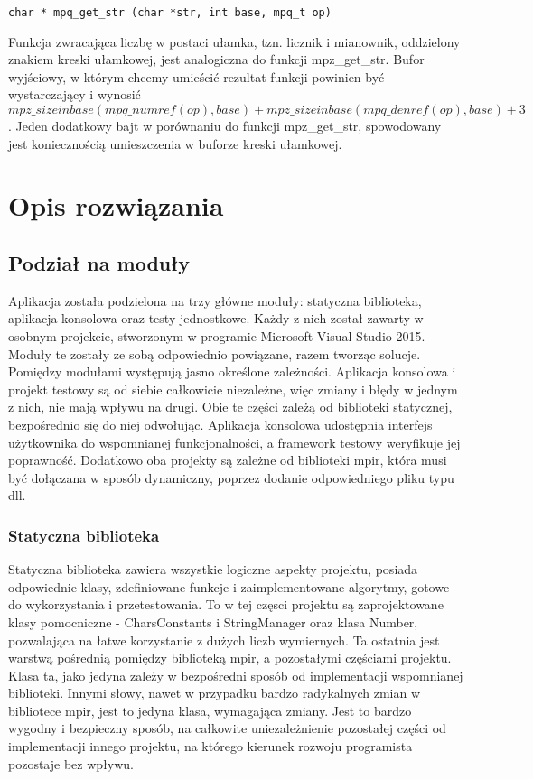 \documentclass[twoside,a4paper]{book}
\begin{document}
\begin{lstlisting}
char * mpq_get_str (char *str, int base, mpq_t op)
\end{lstlisting}

Funkcja zwracająca liczbę w postaci ułamka, tzn. licznik i mianownik, oddzielony znakiem kreski ułamkowej, jest analogiczna do funkcji mpz\_get\_str. Bufor wyjściowy, w którym chcemy umieścić rezultat funkcji powinien być wystarczający i wynosić $mpz\_sizeinbase(mpq\_numref(op), base) + mpz\_sizeinbase (mpq\_denref(op), base) + 3$. Jeden dodatkowy bajt w porównaniu do funkcji mpz\_get\_str, spowodowany jest koniecznością umieszczenia w buforze kreski ułamkowej.


\chapter{Opis rozwiązania}
\section{Podział na moduły}

Aplikacja została podzielona na trzy główne moduły: statyczna biblioteka, aplikacja konsolowa oraz testy jednostkowe. Każdy z nich został zawarty w osobnym projekcie, stworzonym w programie Microsoft Visual Studio 2015. Moduły te zostały ze sobą odpowiednio powiązane, razem tworząc solucje. Pomiędzy modułami występują jasno określone zależności. Aplikacja konsolowa i projekt testowy są od siebie całkowicie niezależne, więc zmiany i błędy w jednym z nich, nie mają wpływu na drugi. Obie te części zależą od biblioteki statycznej, bezpośrednio się do niej odwołując. Aplikacja konsolowa udostępnia interfejs użytkownika do wspomnianej funkcjonalności, a framework testowy weryfikuje jej poprawność. Dodatkowo oba projekty są zależne od biblioteki mpir, która musi być dołączana w sposób dynamiczny, poprzez dodanie odpowiedniego pliku typu dll. 

\subsection{Statyczna biblioteka}

Statyczna biblioteka zawiera wszystkie logiczne aspekty projektu, posiada odpowiednie klasy, zdefiniowane funkcje i zaimplementowane algorytmy, gotowe do wykorzystania i przetestowania. To w tej częsci projektu są zaprojektowane klasy pomocniczne - CharsConstants i StringManager oraz klasa Number, pozwalająca na łatwe korzystanie z dużych liczb wymiernych. Ta ostatnia jest warstwą pośrednią pomiędzy biblioteką mpir, a pozostałymi częściami projektu. Klasa ta, jako jedyna zależy w bezpośredni sposób od implementacji wspomnianej biblioteki. Innymi słowy, nawet w przypadku bardzo radykalnych zmian w bibliotece mpir, jest to jedyna klasa, wymagająca zmiany. Jest to bardzo wygodny i bezpieczny sposób, na całkowite uniezależnienie pozostałej części od implementacji innego projektu, na którego kierunek rozwoju programista pozostaje bez wpływu.
\end{document}
